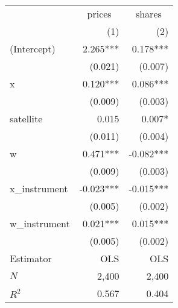 \begin{tabular}{lrr}
\toprule
             & \multicolumn{1}{c}{prices} & \multicolumn{1}{c}{shares} \\ 
\cmidrule(lr){2-2} \cmidrule(lr){3-3} 
             &                        (1) &                        (2) \\ 
\midrule
(Intercept)  &                   2.265*** &                   0.178*** \\ 
             &                    (0.021) &                    (0.007) \\ 
x            &                   0.120*** &                   0.086*** \\ 
             &                    (0.009) &                    (0.003) \\ 
satellite    &                      0.015 &                     0.007* \\ 
             &                    (0.011) &                    (0.004) \\ 
w            &                   0.471*** &                  -0.082*** \\ 
             &                    (0.009) &                    (0.003) \\ 
x_instrument &                  -0.023*** &                  -0.015*** \\ 
             &                    (0.005) &                    (0.002) \\ 
w_instrument &                   0.021*** &                   0.015*** \\ 
             &                    (0.005) &                    (0.002) \\ 
\midrule
Estimator    &                        OLS &                        OLS \\ 
\midrule
$N$          &                      2,400 &                      2,400 \\ 
$R^2$        &                      0.567 &                      0.404 \\ 
\bottomrule
\end{tabular}
